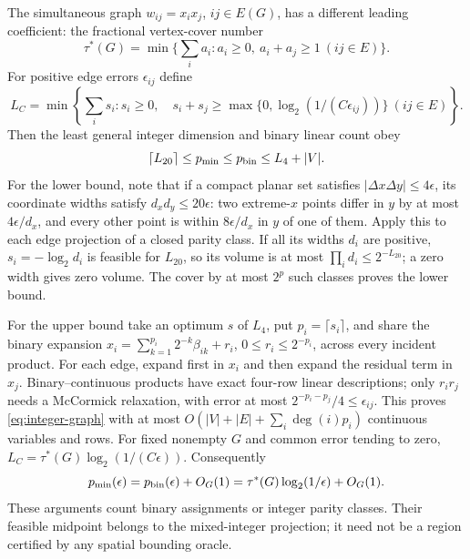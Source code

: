The simultaneous graph $w_{ij}=x_ix_j$, $ij\in E(G)$, has a different
leading coefficient: the fractional vertex-cover number
\[
 \tau^*(G)=\min\{\textstyle\sum_i a_i:a_i\ge0,\ a_i+a_j\ge1\ (ij\in E)\}.
\]
For positive edge errors $\epsilon_{ij}$ define
\[
 L_C=\min\left\{\sum_i s_i:s_i\ge0,\quad
 s_i+s_j\ge\max\{0,\log_2(1/(C\epsilon_{ij}))\}\ (ij\in E)\right\}.
\]
Then the least general integer dimension and binary linear count obey
\begin{equation}\label{eq:integer-graph}
 \lceil L_{20}\rceil\le p_{\min}\le p_{\rm bin}\le L_4+|V|.
\end{equation}
For the lower bound, note that if a compact planar set satisfies
$|\Delta x\Delta y|\le4\epsilon$, its coordinate widths satisfy
$d_xd_y\le20\epsilon$: two extreme-$x$ points differ in $y$ by at most
$4\epsilon/d_x$, and every other point is within $8\epsilon/d_x$ in
$y$ of one of them. Apply this to each edge projection of a closed parity
class. If all its widths $d_i$ are positive, $s_i=-\log_2d_i$ is feasible
for $L_{20}$, so its volume is at most $\prod_i d_i\le2^{-L_{20}}$;
a zero width gives zero volume. The cover by at most $2^p$
such classes proves the lower bound.

For the upper bound take an optimum $s$ of $L_4$, put $p_i=\lceil s_i\rceil$,
and share the binary expansion
$x_i=\sum_{k=1}^{p_i}2^{-k}\beta_{ik}+r_i$, $0\le r_i\le2^{-p_i}$,
across every incident product. For each edge, expand first in $x_i$ and
then expand the residual term in $x_j$. Binary--continuous products have
exact four-row linear descriptions; only $r_ir_j$ needs a McCormick
relaxation, with error at most $2^{-p_i-p_j}/4\le\epsilon_{ij}$.
This proves \eqref{eq:integer-graph} with at most
$O(|V|+|E|+\sum_i\deg(i)p_i)$ continuous variables and rows.
For fixed nonempty $G$ and common error tending to zero,
$L_C=\tau^*(G)\log_2(1/(C\epsilon))$. Consequently
\[
 p_{\min}(\epsilon)=p_{\rm bin}(\epsilon)+O_G(1)
 =\tau^*(G)\log_2(1/\epsilon)+O_G(1).
\]
These arguments count binary assignments or integer parity classes.
Their feasible midpoint belongs to the mixed-integer projection; it
need not be a region certified by any spatial bounding oracle.
